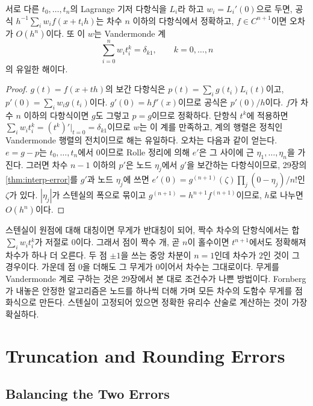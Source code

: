 \begin{proposition}
\label{prop:fd-weights}
서로 다른 $t_0,\dots,t_n$의 Lagrange 기저 다항식을 $L_i$라 하고 $w_i=L_i'(0)$으로 두면, 공식 $h^{-1}\sum_iw_if(x+t_ih)$는 차수 $n$ 이하의 다항식에서 정확하고, $f\in C^{n+1}$이면 오차가 $O(h^n)$이다. 또 이 $w$는 Vandermonde 계
\[
\sum_{i=0}^nw_it_i^k=\delta_{k1},\qquad k=0,\dots,n
\]
의 유일한 해이다.
\end{proposition}

\begin{proof}
$g(t)=f(x+th)$의 보간 다항식은 $p(t)=\sum_ig(t_i)L_i(t)$이고, $p'(0)=\sum_iw_ig(t_i)$이다. $g'(0)=hf'(x)$이므로 공식은 $p'(0)/h$이다. $f$가 차수 $n$ 이하의 다항식이면 $g$도 그렇고 $p=g$이므로 정확하다. 단항식 $t^k$에 적용하면 $\sum_iw_it_i^k=(t^k)'\big|_{t=0}=\delta_{k1}$이므로 $w$는 이 계를 만족하고, 계의 행렬은 정칙인 Vandermonde 행렬의 전치이므로 해는 유일하다. 오차는 다음과 같이 얻는다. $e=g-p$는 $t_0,\dots,t_n$에서 $0$이므로 Rolle 정리에 의해 $e'$은 그 사이에 근 $\eta_1,\dots,\eta_n$을 가진다. 그러면 차수 $n-1$ 이하의 $p'$은 노드 $\eta_j$에서 $g'$을 보간하는 다항식이므로, 29장의 \cref{thm:interp-error}를 $g'$과 노드 $\eta_j$에 쓰면 $e'(0)=g^{(n+1)}(\zeta)\prod_j(0-\eta_j)/n!$인 $\zeta$가 있다. $|\eta_j|$가 스텐실의 폭으로 묶이고 $g^{(n+1)}=h^{n+1}f^{(n+1)}$이므로, $h$로 나누면 $O(h^n)$이다.
\end{proof}

스텐실이 원점에 대해 대칭이면 무게가 반대칭이 되어, 짝수 차수의 단항식에서는 합 $\sum_iw_it_i^k$가 저절로 $0$이다. 그래서 점이 짝수 개, 곧 $n$이 홀수이면 $t^{n+1}$에서도 정확해져 차수가 하나 더 오른다. 두 점 $\pm1$을 쓰는 중앙 차분이 $n=1$인데 차수가 $2$인 것이 그 경우이다. 가운데 점 $0$을 더해도 그 무게가 $0$이어서 차수는 그대로이다. 무게를 Vandermonde 계로 구하는 것은 29장에서 본 대로 조건수가 나쁜 방법이다. Fornberg가 내놓은 안정한 알고리즘은 노드를 하나씩 더해 가며 모든 차수의 도함수 무게를 점화식으로 만든다\cite{fornberg1988}. 스텐실이 고정되어 있으면 정확한 유리수 산술로 계산하는 것이 가장 확실하다.

\section{Truncation and Rounding Errors}
\label{sec:fd-rounding}

\subsection{Balancing the Two Errors}

